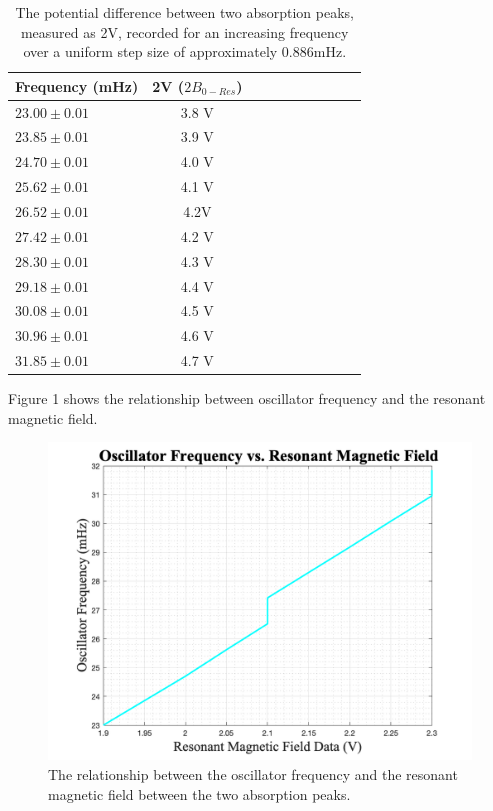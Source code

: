 \documentclass[twoside,10pt]{article}
\begin{document}
\begin{multicols}{2}
			\begin{table}[H]
			\centering
			\caption{The potential difference between two absorption peaks, measured as 2V, recorded for an increasing frequency over a uniform step size of approximately 0.886mHz.  }
			\begin{tabular}{l c c rrrrrrr}
				\toprule				
				Frequency (mHz) & 2V ($2 B_{0 - Res}$)  \\ [1ex]
				\midrule
			$23.00 \pm 0.01	$ &	3.8  V  \\ [1.5ex]
			$ 23.85 \pm 0.01$	&	3.9 V \\ [1.5ex]
			$ 24.70 \pm 0.01$	&	4.0 V  \\ [1.5ex]
			$25.62 \pm 0.01$  & 4.1 V \\ [1.5ex]
			$26.52 \pm 0.01$  & 4.2V \\ [1.5ex]
			$27.42 \pm 0.01$ & 4.2 V \\ [1.5ex]
			$ 28.30 \pm 0.01 $ & 4.3 V \\ [1.5ex]
			$ 29.18 \pm 0.01$ & 4.4 V \\ [1.5ex]
			$ 30.08 \pm 0.01$ & 4.5 V  \\ [1.5ex]
			$30.96 \pm 0.01$ &  4.6 V \\ [1.5ex]
			$31.85 \pm 0.01$ & 4.7 V \\ [1.5ex]
			
				\bottomrule
			\end{tabular}
		\end{table}
	
	Figure 1 shows the relationship between oscillator frequency and the resonant magnetic field. 
	
		\begin{figure}[H]
		\centering
		\includegraphics[width=\linewidth]{oscillator_vs_field.png}
		\caption{The relationship between the oscillator frequency and the resonant magnetic field between the two absorption peaks.  }
	\end{figure}


\end{multicols}
\end{document}
